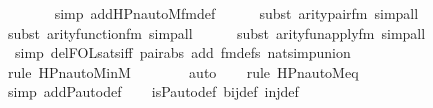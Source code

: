 \begin{isabellebody}
\ \ \ \ \ \ \isamarkupfalse%
{\isacharparenleft}{\kern0pt}simp\ add{\isacharcolon}{\kern0pt}HPn{\isacharunderscore}{\kern0pt}auto{\isacharunderscore}{\kern0pt}M{\isacharunderscore}{\kern0pt}fm{\isacharprime}{\kern0pt}{\isacharunderscore}{\kern0pt}def{\isacharparenright}{\kern0pt}{\isacharplus}{\kern0pt}\isanewline
\ \ \ \ \ \isamarkupfalse%
{\isacharparenleft}{\kern0pt}subst\ arity{\isacharunderscore}{\kern0pt}pair{\isacharunderscore}{\kern0pt}fm{\isacharcomma}{\kern0pt}\ simp{\isacharunderscore}{\kern0pt}all{\isacharparenright}{\kern0pt}{\isacharplus}{\kern0pt}\isanewline
\ \ \ \ \ \isamarkupfalse%
{\isacharparenleft}{\kern0pt}subst\ arity{\isacharunderscore}{\kern0pt}function{\isacharunderscore}{\kern0pt}fm{\isacharcomma}{\kern0pt}\ simp{\isacharunderscore}{\kern0pt}all{\isacharparenright}{\kern0pt}\isanewline
\ \ \ \ \ \isamarkupfalse%
{\isacharparenleft}{\kern0pt}subst\ arity{\isacharunderscore}{\kern0pt}fun{\isacharunderscore}{\kern0pt}apply{\isacharunderscore}{\kern0pt}fm{\isacharcomma}{\kern0pt}\ simp{\isacharunderscore}{\kern0pt}all{\isacharparenright}{\kern0pt}{\isacharplus}{\kern0pt}\isanewline
\ \ \ \ \ \isamarkupfalse%
\ {\isacharparenleft}{\kern0pt}simp\ del{\isacharcolon}{\kern0pt}FOL{\isacharunderscore}{\kern0pt}sats{\isacharunderscore}{\kern0pt}iff\ pair{\isacharunderscore}{\kern0pt}abs\ add{\isacharcolon}{\kern0pt}\ fm{\isacharunderscore}{\kern0pt}defs\ nat{\isacharunderscore}{\kern0pt}simp{\isacharunderscore}{\kern0pt}union{\isacharparenright}{\kern0pt}\ \isanewline
\ \ \ \ \isamarkupfalse%
{\isacharparenleft}{\kern0pt}rule\ HPn{\isacharunderscore}{\kern0pt}auto{\isacharunderscore}{\kern0pt}M{\isacharunderscore}{\kern0pt}in{\isacharunderscore}{\kern0pt}M{\isacharparenright}{\kern0pt}\isanewline
\ \ \ \ \ \ \isamarkupfalse%
\ auto{\isacharbrackleft}{\kern0pt}{}{\isacharbrackright}{\kern0pt}\isanewline
\ \ \ \isamarkupfalse%
{\isacharparenleft}{\kern0pt}rule\ HPn{\isacharunderscore}{\kern0pt}auto{\isacharunderscore}{\kern0pt}M{\isacharunderscore}{\kern0pt}eq{\isacharparenright}{\kern0pt}\isanewline
\ \ \ \ \ \ \ \ \ \ \ \isamarkupfalse%
{\isacharparenleft}{\kern0pt}simp\ add{\isacharcolon}{\kern0pt}P{\isacharunderscore}{\kern0pt}auto{\isacharunderscore}{\kern0pt}def{\isacharparenright}{\kern0pt}\isanewline
\ \ \isamarkupfalse%
\ is{\isacharunderscore}{\kern0pt}P{\isacharunderscore}{\kern0pt}auto{\isacharunderscore}{\kern0pt}def\ bij{\isacharunderscore}{\kern0pt}def\ inj{\isacharunderscore}{\kern0pt}def\ \isanewline

\end{isabellebody}
